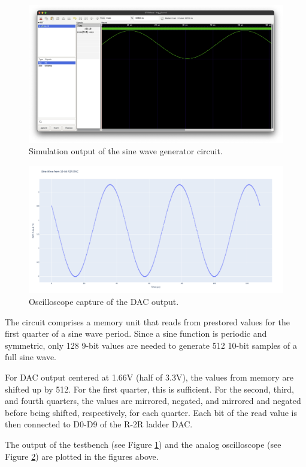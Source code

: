 \documentclass{article}
\begin{document}
\begin{figure}
    \centering
    \includegraphics[width=1\textwidth]{sim.png}
    \caption{Simulation output of the sine wave generator circuit.}
    \label{fig:simulation}
\end{figure}

\begin{figure}
    \centering
    \includegraphics[width=1\textwidth]{plot.png}
    \caption{Oscilloscope capture of the DAC output.}
    \label{fig:oscilloscope}
\end{figure}

\clearpage

The circuit comprises a memory unit that reads from prestored values for the first quarter of a sine wave period. Since a sine function is periodic and symmetric, only 128 9-bit values are needed to generate 512 10-bit samples of a full sine wave. 

For DAC output centered at 1.66V (half of 3.3V), the values from memory are shifted up by 512. For the first quarter, this is sufficient. For the second, third, and fourth quarters, the values are mirrored, negated, and mirrored and negated before being shifted, respectively, for each quarter. Each bit of the read value is then connected to D0-D9 of the R-2R ladder DAC.

The output of the testbench (see Figure \ref{fig:simulation}) and the analog oscilloscope (see Figure \ref{fig:oscilloscope}) are plotted in the figures above.
\end{document}
